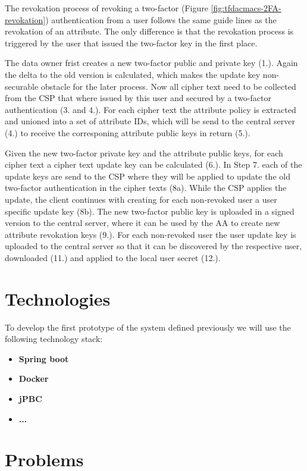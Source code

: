 The revokation process of revoking a two-factor (Figure \ref{fig:tfdacmacs-2FA-revokation}) authentication from a user follows the same guide lines as the revokation of an attribute. The only difference is that the revokation process is triggered by the user that issued the two-factor key in the first place. 

The data owner frist creates a new two-factor public and private key (1.). Again the delta to the old version is calculated, which makes the update key non-securable obstacle for the later process. Now all cipher text need to be collected from the CSP that where issued by this user and secured by a two-factor authentication (3. and 4.). For each cipher text the attribute policy is extracted and unioned into a set of attribute IDs, which will be send to the central server (4.) to receive the corresponing attribute public keys in return (5.).

Given the new two-factor private key and the attribute public keys, for each cipher text a cipher text update key can be calculated (6.). In Step 7. each of the update keys are send to the CSP where they will be applied to update the old two-factor authentication in the cipher texts (8a). While the CSP applies the update, the client continues with creating for each non-revoked user a user specific update key (8b). The new two-factor public key is uploaded in a signed version to the central server, where it can be used by the AA to create new attribute revokation keys (9.). For each non-revoked user the user update key is uploaded to the central server so that it can be discovered by the respective user, downloaded (11.) and applied to the local user secret (12.).   

\section{Technologies}
To develop the first prototype of the system defined previously we will use the following technology stack:

\begin{itemize}
  \item \textbf{Spring boot}
  \item \textbf{Docker}
  \item \textbf{jPBC} \cite{ISCC:DecIov11}
  \item \textbf{...}
\end{itemize}

\section{Problems}

